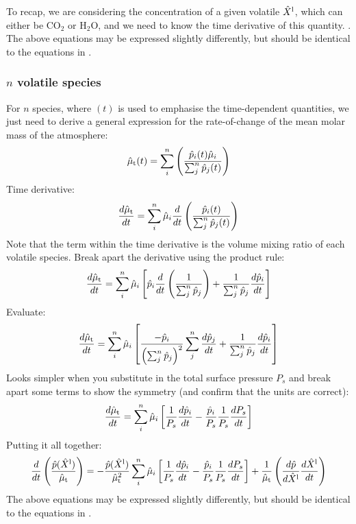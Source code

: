 To recap, we are considering the concentration of a given volatile $\hat{X}^{\rm l}$, which can either be CO$_2$ or H$_2$O, and we need to know the time derivative of this quantity.  .  The above equations may be expressed slightly differently, but should be identical to the equations in \citet[Appendix A,][]{BKW19}.
\subsubsection{$n$ volatile species}
For $n$ species, where $(t)$ is used to emphasise the time-dependent quantities, we just need to derive a general expression for the rate-of-change of the mean molar mass of the atmosphere:
\begin{equation}
\hat{\mu}_{\rm t}(t) = \sum_i^n \left( \frac{\hat{p}_i(t) \hat{\mu}_i}{\sum_j^n \hat{p}_j(t)} \right)
\end{equation}
Time derivative:
\begin{equation}
\frac{d \hat{\mu}_{\rm t}}{d t} = \sum_i^n \hat{\mu}_i \frac{d}{d t} \left( \frac{\hat{p}_i(t)}{\sum_j^n \hat{p}_j(t)} \right)
\end{equation}
Note that the term within the time derivative is the volume mixing ratio of each volatile species.  Break apart the derivative using the product rule:
\begin{equation}
\frac{d \hat{\mu}_{\rm t}}{d t} = \sum_i^n \hat{\mu}_i \left[ \hat{p}_i \frac{d}{d t} \left( \frac{1}{\sum_j^n \hat{p}_j} \right) + \frac{1}{\sum_j^n \hat{p}_j} \frac{d \hat{p}_i}{d t} \right]
\end{equation}
Evaluate:
\begin{equation}
\frac{d \hat{\mu}_{\rm t}}{d t} = \sum_i^n \hat{\mu}_i \left[ \frac{-\hat{p}_i}{\left( \sum_j^n \hat{p}_j \right)^2} \sum_j^n \frac{d \hat{p}_j}{d t} + \frac{1}{\sum_j^n \hat{p}_j} \frac{d \hat{p}_i}{d t} \right]
\end{equation}
Looks simpler when you substitute in the total surface pressure $P_s$ and break apart some terms to show the symmetry (and confirm that the units are correct):
\begin{equation}
\frac{d \hat{\mu}_{\rm t}}{d t} = \sum_i^n \hat{\mu}_i \left[ \frac{1}{P_s} \frac{d \hat{p}_i}{d t} - \frac{\hat{p}_i}{P_s} \frac{1}{P_s} \frac{d P_s}{d t} \right]
\end{equation}
Putting it all together:
\begin{equation}
\frac{d}{dt} \left( \frac{\hat{p}(\hat{X}^{\rm l})}{\hat{\mu}_{\rm t}} \right) = -\frac{\hat{p}(\hat{X}^{\rm l})}{\hat{\mu}_{\rm t}^2} \sum_i^n \hat{\mu}_i \left[ \frac{1}{P_s} \frac{d \hat{p}_i}{d t} - \frac{\hat{p}_i}{P_s} \frac{1}{P_s} \frac{d P_s}{d t} \right] + \frac{1}{\hat{\mu}_{\rm t}} \left( \frac{d \hat{p}}{d \hat{X}^{\rm l}} \frac{d \hat{X}^{\rm l}}{d t} \right)
\end{equation}
The above equations may be expressed slightly differently, but should be identical to the equations in \citet[Appendix A,][]{BKW19}.

